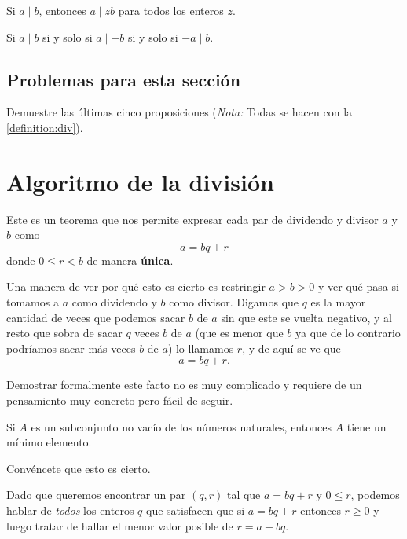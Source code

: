 \begin{proposition}
	Si $a \mid b$, entonces $a \mid zb$
	para todos los enteros $z$.
\end{proposition}

\begin{proposition}
	Si $a \mid b$ si y solo si $a \mid -b$
	si y solo si $-a \mid b$.
\end{proposition}

\subsection*{Problemas para esta sección}
\begin{problem}
Demuestre las últimas cinco
proposiciones (\textit{Nota: } Todas se hacen
con la \autoref{definition:div}).
\end{problem}

\section{Algoritmo de la división}
Este es un teorema que nos permite expresar
cada par de dividendo y divisor $a$ y $b$
como
\[a = bq + r\]
donde $0 \leq r < b$ de manera \textbf{única}.

Una manera de ver por qué esto es cierto
es restringir $a > b > 0$ y ver qué pasa
si tomamos a $a$ como dividendo y $b$
como divisor.
Digamos que $q$ es la mayor cantidad de veces que
podemos sacar $b$ de $a$ sin que este se vuelta
negativo, y al resto que sobra de sacar $q$
veces $b$ de $a$ (que es menor que $b$
ya que de lo contrario podríamos sacar más veces $b$
de $a$)
lo llamamos $r$, y de aquí se ve que
\[a = bq + r.\]

Demostrar formalmente este facto no es muy
complicado y requiere de un pensamiento
muy concreto pero fácil de seguir.

\begin{proposition}
	\label{proposition:well_order}
	Si $A$ es un subconjunto no vacío
	de los números naturales, entonces $A$
	tiene un mínimo elemento.
\end{proposition}

\begin{question*}
	Convéncete que esto es cierto.
\end{question*}

Dado que queremos encontrar un par $(q, r)$
tal que $a = bq + r$ y $0 \leq r$,
podemos hablar de \textit{todos}
los enteros $q$ que satisfacen que si
$a = bq + r$ entonces $r \geq 0$
y luego tratar de hallar
el menor valor posible de $r = a - bq$.

